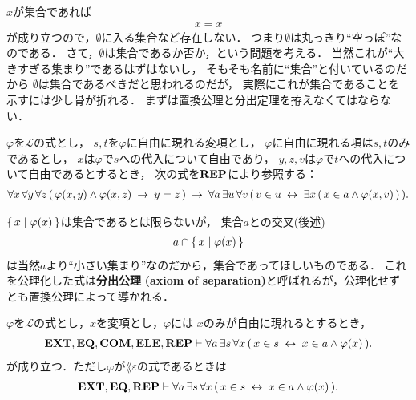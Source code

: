 	$x$が集合であれば
	\begin{align}
		x = x
	\end{align}
	が成り立つので，$\emptyset$に入る集合など存在しない．
	つまり$\emptyset$は丸っきり``空っぽ''なのである．
	さて，$\emptyset$は集合であるか否か，という問題を考える．
	当然これが``大きすぎる集まり''であるはずはないし，
	そもそも名前に``集合''と付いているのだから
	$\emptyset$は集合であるべきだと思われるのだが，
	実際にこれが集合であることを示すには少し骨が折れる．
	まずは置換公理と分出定理を拵えなくてはならない．
	
	\begin{screen}
		\begin{axm}[置換公理]
			$\varphi$を$\mathcal{L}$の式とし，
			$s,t$を$\varphi$に自由に現れる変項とし，
			$\varphi$に自由に現れる項は$s,t$のみであるとし，
			$x$は$\varphi$で$s$への代入について自由であり，
			$y,z,v$は$\varphi$で$t$への代入について自由であるとするとき，
			次の式を$\mbox{{\bf REP}}$により参照する：
			\begin{align}
				\forall x\, \forall y\, \forall z\, 
				(\, \varphi(x,y) \wedge \varphi(x,z)
				\hspace{0.25em}\rightarrow\hspace{0.25em} y = z\, )
				\hspace{0.25em}\rightarrow\hspace{0.25em} \forall a\, \exists u\, \forall v\,
				(\, v \in u \hspace{0.25em}\leftrightarrow\hspace{0.25em} \exists x\, (\, x \in a \wedge 
				\varphi(x,v)\, )\, ).
			\end{align}
		\end{axm}
	\end{screen}
	
	$\{\, x \mid \varphi(x)\, \}$は集合であるとは限らないが，
	集合$a$との交叉(後述)
	\begin{align}
		a \cap \{\, x \mid \varphi(x)\, \}
	\end{align}
	は当然$a$より``小さい集まり''なのだから，集合であってほしいものである．
	これを公理化した式は{\bf 分出公理}\index{ぶんしゅつこうり@分出公理}
	{\bf (axiom of separation)}と呼ばれるが，公理化せずとも置換公理によって導かれる．
	
	\begin{screen}
		\begin{thm}[分出定理]\label{thm:axiom_of_separation}
			$\varphi$を$\mathcal{L}$の式とし，$x$を変項とし，$\varphi$には
			$x$のみが自由に現れるとするとき，
			\begin{align}
				\mbox{{\bf EXT}},\mbox{{\bf EQ}},\mbox{\bf COM},\mbox{{\bf ELE}},\mbox{{\bf REP}} \vdash 
				\forall a\, \exists s\, \forall x\,
				(\, x \in s \hspace{0.25em}\leftrightarrow\hspace{0.25em} x \in a \wedge \varphi(x)\, ).
				\label{fom:thm_axiom_of_separation_0}
			\end{align}
			が成り立つ．ただし$\varphi$が$\lang{\varepsilon}$の式であるときは
			\begin{align}
				\mbox{{\bf EXT}},\mbox{{\bf EQ}},\mbox{{\bf REP}} \vdash 
				\forall a\, \exists s\, \forall x\,
				(\, x \in s \hspace{0.25em}\leftrightarrow\hspace{0.25em} x \in a \wedge \varphi(x)\, ).
			\end{align}
		\end{thm}
	\end{screen}
	
